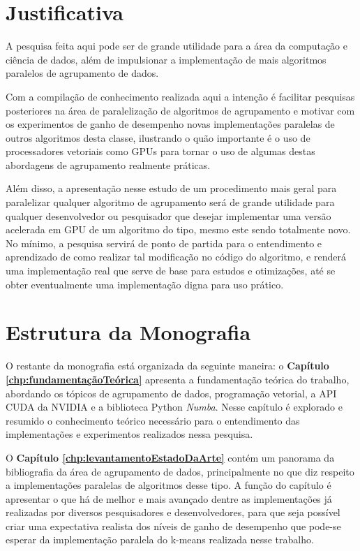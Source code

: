 \documentclass[12pt,
openright, 
oneside, %
a4paper,    %
brazil]{facom-ufu-abntex2}
\begin{document}

\section{Justificativa}

A pesquisa feita aqui pode ser de grande utilidade para a área da computação e ciência de dados, além de impulsionar a implementação de mais algoritmos paralelos de agrupamento de dados.

Com a compilação de conhecimento realizada aqui a intenção é facilitar pesquisas posteriores na área de paralelização de algoritmos de agrupamento e motivar com os experimentos de ganho de desempenho novas implementações paralelas de outros algoritmos desta classe, ilustrando o quão importante é o uso de processadores vetoriais como GPUs para tornar o uso de algumas destas abordagens de agrupamento realmente práticas.

Além disso, a apresentação nesse estudo de um procedimento mais geral para paralelizar qualquer algoritmo de agrupamento será de grande utilidade para qualquer desenvolvedor ou pesquisador que desejar implementar uma versão acelerada em GPU de um algoritmo do tipo, mesmo este sendo totalmente novo. No mínimo, a pesquisa servirá de ponto de partida para o entendimento e aprendizado de como realizar tal modificação no código do algoritmo, e renderá uma implementação real que serve de base para estudos e otimizações, até se obter eventualmente uma implementação digna para uso prático.




\section{Estrutura da Monografia}

O restante da monografia está organizada da seguinte maneira: o \textbf{Capítulo \ref{chp:fundamentaçãoTeórica}} apresenta a fundamentação teórica do trabalho, abordando os tópicos de agrupamento de dados, programação vetorial, a API CUDA da NVIDIA e a biblioteca Python \textit{Numba}. Nesse capítulo é explorado e resumido o conhecimento teórico necessário para o entendimento das implementações e experimentos realizados nessa pesquisa.

O \textbf{Capítulo \ref{chp:levantamentoEstadoDaArte}} contém um panorama da bibliografia da área de agrupamento de dados, principalmente no que diz respeito a implementações paralelas de algoritmos desse tipo. A função do capítulo é apresentar o que há de melhor e mais avançado dentre as implementações já realizadas por diversos pesquisadores e desenvolvedores, para que seja possível criar uma expectativa realista dos níveis de ganho de desempenho que pode-se esperar da implementação paralela do k-means realizada nesse trabalho.
\end{document}
